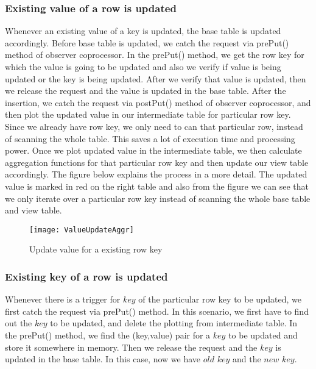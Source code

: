 \documentclass[11pt,a4paper,bibtotoc,idxtotoc,headsepline,footsepline,footexclude,BCOR12mm,DIV13]{scrbook}
\begin{document}
\subsubsection{Existing value of a row is updated}
Whenever an existing value of a key is updated, the base table is updated accordingly. Before base table is updated, we catch the request via prePut() method of observer coprocessor. In the prePut() method, we get the row key for which the value is going to be updated and also we verify if value is being updated or the key is being updated. After we verify that value is updated, then we release the request and the value is updated in the base table. After the insertion, we catch the request via postPut() method of observer coprocessor, and then plot the updated value in our intermediate table for particular row key. Since we already have row key, we only need to can that particular row, instead of scanning the whole table. This saves a lot of execution time and processing power. Once we plot updated value in the intermediate table, we then calculate aggregation functions for that particular row key and then update our view table accordingly.
The figure below explains the process in a more detail. The updated value is marked in red on the right table and also from the figure we can see that we only iterate over a particular row key instead of scanning the whole base table and view table.

\begin{figure}
	\centering
	\texttt{[image: ValueUpdateAggr]}
	\caption{Update value for a existing row key}
	\label{sec:updatevalueforexistingkey}
	
\end{figure}  

\newpage
\subsubsection{Existing key of a row is updated}
Whenever there is a trigger for $key$ of the particular row key to be updated, we first catch the request via prePut() method. In this scenario, we first have to find out the $key$ to be updated, and delete the plotting from intermediate table. In the prePut() method, we find the (key,value) pair for a $key$ to be updated and store it somewhere in memory. Then we release the request and the $key$ is updated in the base table. In this case, now we have $old$ $key$ and the $new$ $key$. 
\end{document}
